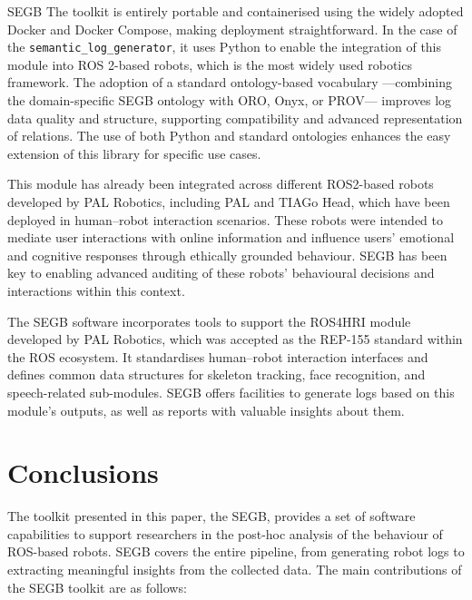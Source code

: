 \documentclass[preprint,12pt, a4paper]{elsarticle}
\begin{document}
\ac{SEGB} The toolkit is entirely portable and containerised using the widely adopted Docker and Docker Compose, making deployment straightforward. In the case of the \texttt{semantic\_log\_generator}, it uses Python to enable the integration of this module into ROS 2-based robots, which is the most widely used robotics framework. The adoption of a standard ontology-based vocabulary —combining the domain-specific \ac{SEGB} ontology with \ac{ORO}, Onyx, or \ac{PROV}— improves log data quality and structure, supporting compatibility and advanced representation of relations. The use of both Python and standard ontologies enhances the easy extension of this library for specific use cases.


 This module has already been integrated across different ROS2-based robots developed by PAL Robotics, including PAL and TIAGo Head, which have been deployed in human–robot interaction scenarios. These robots were intended to mediate user interactions with online information and influence users’ emotional and cognitive responses through ethically grounded behaviour. \ac{SEGB} has been key to enabling advanced auditing of these robots’ behavioural decisions and interactions within this context.


The \ac{SEGB} software incorporates tools to support the ROS4HRI module developed by PAL Robotics, which was accepted as the REP-155 standard within the \ac{ROS} ecosystem. It standardises human–robot interaction interfaces and defines common data structures for skeleton tracking, face recognition, and speech-related sub-modules. \ac{SEGB} offers facilities to generate logs based on this module's outputs, as well as reports with valuable insights about them. 



\section{Conclusions}

The toolkit presented in this paper, the \ac{SEGB}, provides a set of software capabilities to support researchers in the post-hoc analysis of the behaviour of ROS-based robots. SEGB covers the entire pipeline, from generating robot logs to extracting meaningful insights from the collected data. The main contributions of the \ac{SEGB} toolkit are as follows:
\end{document}
